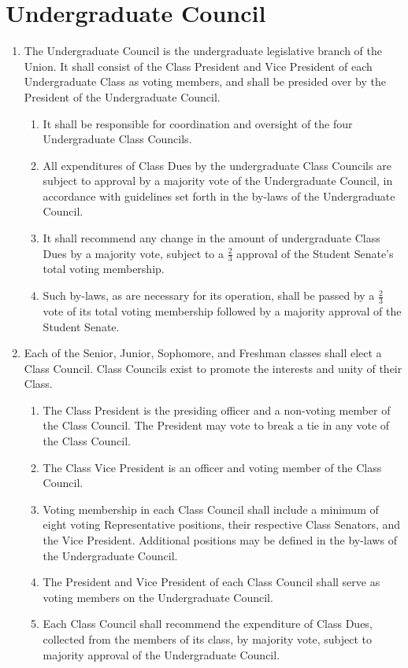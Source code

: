 \section{Undergraduate Council}
\begin{enumerate}
\item The Undergraduate Council is the undergraduate legislative branch of the Union. It shall consist of the Class President and Vice President of each Undergraduate Class as voting members, and shall be presided over by the President of the Undergraduate Council.
\begin{enumerate}
\item It shall be responsible for coordination and oversight of the four Undergraduate Class Councils.
\item All expenditures of Class Dues by the undergraduate Class Councils are subject to approval by a majority vote of the Undergraduate Council, in accordance with guidelines set forth in the by-laws of the Undergraduate Council.
\item It shall recommend any change in the amount of undergraduate Class Dues by a majority vote, subject to a $\frac{2}{3}$ approval of the Student Senate’s total voting membership.
\item Such by-laws, as are necessary for its operation, shall be passed by a $\frac{2}{3}$ vote of its total voting membership followed by a majority approval of the Student Senate.
\end{enumerate}
\item Each of the Senior, Junior, Sophomore, and Freshman classes shall elect a Class Council. Class Councils exist to promote the interests and unity of their Class.
\begin{enumerate}
\item The Class President is the presiding officer and a non-voting member of the Class
Council. The President may vote to break a tie in any vote of the Class Council.
\item The Class Vice President is an officer and voting member of the Class Council.
\item Voting membership in each Class Council shall include a minimum of eight voting Representative positions, their respective Class Senators, and the Vice President. Additional positions may be defined in the by-laws of the Undergraduate Council.
\item The President and Vice President of each Class Council shall serve as voting members on the Undergraduate Council.
\item Each Class Council shall recommend the expenditure of Class Dues, collected from the members of its class, by majority vote, subject to majority approval of the Undergraduate Council.

\end{enumerate}
\end{enumerate}

